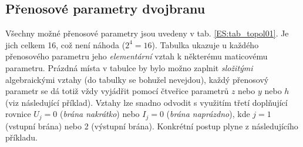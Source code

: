     \subsection{Přenosové parametry dvojbranu}\label{teo:IchapIIsecIsubVIII}
      Všechny možné přenosové parametry jsou uvedeny v tab. \ref{ES:tab_topol01}. Je jich celkem 
      \num{16}, což není náhoda (\(2^4 = 16\)). Tabulka ukazuje u každého přenosového parametru 
      jeho \emph{elementární} vztah k některému maticovému parametru. Prázdná místa v tabulce by 
      bylo možno zaplnit \emph{složitými} algebraickými vztahy (do tabulky se bohužel nevejdou), 
      každý přenosový parametr se dá totiž vždy vyjádřit pomocí čtveřice parametrů \(z\) nebo \(y\) 
      nebo \(h\) (viz následující příklad). Vztahy lze snadno odvodit s využitím třetí doplňující 
      rovnice \(U_j = 0\) (\emph{brána nakrátko}) nebo \(I_j = 0\) (\emph{brána naprázdno}), kde 
      \(j = 1\) (vstupní brána) nebo \num{2} (výstupní brána). Konkrétní postup plyne z 
      následujícího příkladu.

